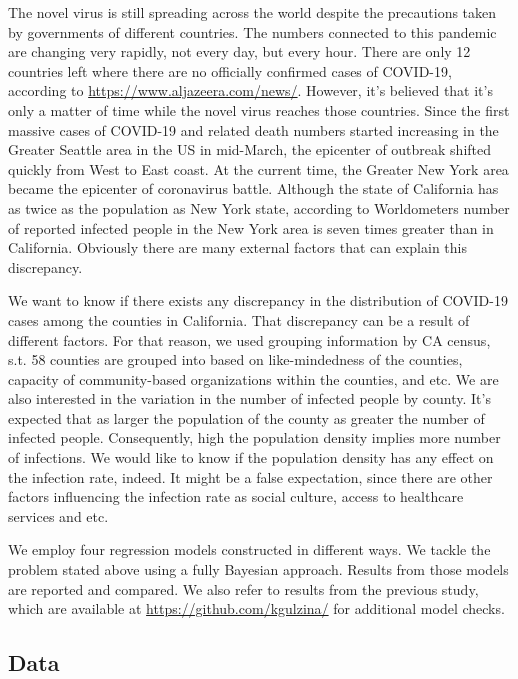 \documentclass[11pt,twocolumn]{asaproc}
\begin{document}
 The novel virus is still spreading across the world despite the precautions taken by governments of different countries. The numbers connected to this pandemic are changing very rapidly, not every day, but every hour.  There are only 12 countries left where there are no officially confirmed cases of COVID-19, according to \url{https://www.aljazeera.com/news/}. However, it's believed that it's only a matter of time while the novel virus reaches those countries. Since the first massive cases of COVID-19 and related death numbers started increasing in the Greater Seattle area in the US in mid-March, the epicenter of outbreak shifted quickly from West to East coast. At the current time, the Greater New York area became the epicenter of coronavirus battle. Although the state of California has as twice as the population as New York state, according to Worldometers number of reported infected people in the New York area is seven times greater than in California. Obviously there are many external factors that can explain this discrepancy.
 
We want to know if there exists any discrepancy in the distribution of COVID-19 cases among the counties in California. That discrepancy can be a result of different factors. For that reason, we used grouping information by CA census, s.t. 58 counties are grouped into based on like-mindedness of the counties, capacity of community-based organizations within the counties, and etc. We are also interested in the variation in the number of infected people by county. It's expected that as larger the population of the county as greater the number of infected people. Consequently, high the population density implies more number of infections. We would like to know if the population density has any effect on the infection rate, indeed. It might be a false expectation, since there are other factors influencing the infection rate as social culture, access to healthcare services and etc. 

We employ four regression models constructed in different ways. We tackle the problem stated above using a fully Bayesian approach. Results from those models are reported and compared. We also refer to results from the previous study, which are available at \url{https://github.com/kgulzina/} for additional model checks.




\subsection{Data}
\end{document}
